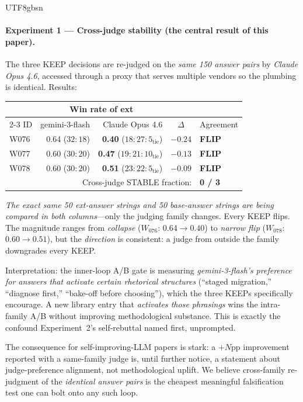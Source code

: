 \documentclass{article}
\begin{document}
\begin{CJK*}{UTF8}{gbsn}
\paragraph{Experiment 1 — Cross-judge stability (the central
result of this paper).} The three KEEP decisions are re-judged on
the \emph{same 150 answer pairs} by \emph{Claude Opus 4.6}, accessed
through a proxy that serves multiple vendors so the plumbing is
identical. Results:
\begin{center}\small
\begin{tabular}{l r r c l}
  \toprule
  & \multicolumn{2}{c}{Win rate of ext} & & \\
  \cmidrule(lr){2-3}
  ID & gemini-3-flash & Claude Opus 4.6 & $\Delta$ & Agreement \\
  \midrule
  W076 & 0.64 ($32 : 18$) & \textbf{0.40} ($18 : 27 :  5_{\text{tie}}$)
    & $-0.24$ & \textbf{FLIP} \\
  W077 & 0.60 ($30 : 20$) & \textbf{0.47} ($19 : 21 : 10_{\text{tie}}$)
    & $-0.13$ & \textbf{FLIP} \\
  W078 & 0.60 ($30 : 20$) & \textbf{0.51} ($23 : 22 :  5_{\text{tie}}$)
    & $-0.09$ & \textbf{FLIP} \\
  \midrule
  \multicolumn{4}{r}{Cross-judge STABLE fraction:} &
  \textbf{0 / 3} \\
  \bottomrule
\end{tabular}
\end{center}

\noindent \emph{The exact same 50 ext-answer strings and 50 base-answer
strings are being compared in both columns}—only the judging
family changes. Every KEEP flips. The magnitude ranges from
\emph{collapse} ($W_{076}$: $0.64 \to 0.40$) to \emph{narrow flip}
($W_{078}$: $0.60 \to 0.51$), but the \emph{direction} is
consistent: a judge from outside the family downgrades every
KEEP.

Interpretation: the inner-loop A/B gate is measuring
\emph{gemini-3-flash's preference for answers that activate
certain rhetorical structures} (``staged migration,'' ``diagnose
first,'' ``bake-off before choosing''), which the three KEEPs
specifically encourage. A new library entry that \emph{activates
those phrasings} wins the intra-family A/B without improving
methodological substance. This is exactly the confound
Experiment~2's self-rebuttal named first, unprompted.

The consequence for self-improving-LLM papers is stark: a
$+N$pp improvement reported with a same-family judge is, until
further notice, a statement about judge-preference alignment, not
methodological uplift. We believe cross-family re-judgment of the
\emph{identical answer pairs} is the cheapest meaningful
falsification test one can bolt onto any such loop.


\end{CJK*}
\end{document}
